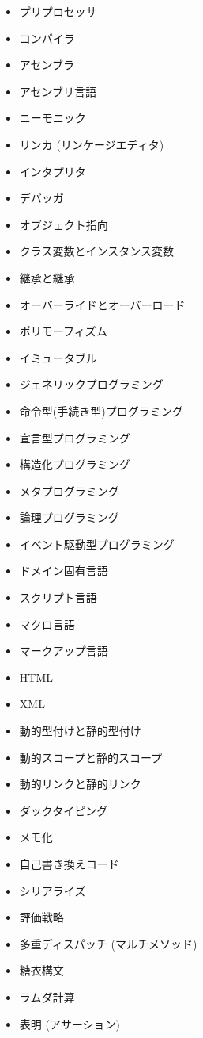 \documentclass[a4j, titlepage, 11pt]{jsarticle}
\begin{document}
\begin{multicols}{2}
\begin{itemize}
	\item プリプロセッサ
	\item コンパイラ
	\item アセンブラ
	\item アセンブリ言語
	\item ニーモニック
	\item リンカ (リンケージエディタ)
	\item インタプリタ
	\item デバッガ
	\item オブジェクト指向
	\item クラス変数とインスタンス変数
	\item 継承と継承
	\item オーバーライドとオーバーロード
	\item ポリモーフィズム
	\item イミュータブル
	\item ジェネリックプログラミング
	\item 命令型(手続き型)プログラミング
	\item 宣言型プログラミング
	\item 構造化プログラミング
	\item メタプログラミング
	\item 論理プログラミング
	\item イベント駆動型プログラミング
	\item ドメイン固有言語
	\item スクリプト言語
	\item マクロ言語
	\item マークアップ言語
	\item HTML
	\item XML
	\item 動的型付けと静的型付け
	\item 動的スコープと静的スコープ
	\item 動的リンクと静的リンク
	\item ダックタイピング
	\item メモ化
	\item 自己書き換えコード
	\item シリアライズ
	\item 評価戦略
	\item 多重ディスパッチ (マルチメソッド)
	\item 糖衣構文
	\item ラムダ計算
	\item 表明 (アサーション)

\end{itemize}
\end{multicols}
\end{document}

